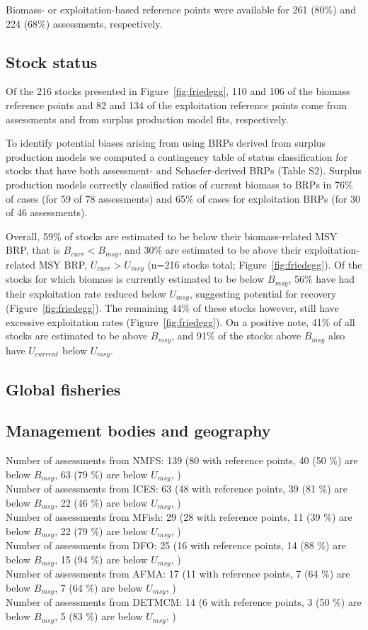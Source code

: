 Biomass- or exploitation-based reference points were available for
261 (80\%) and
224 (68\%)
assessments, respectively.

\subsection*{Stock status}
\noindent
Of the
216 stocks presented in
Figure~\ref{fig:friedegg}, 110 and
106 of the biomass reference points and
82 and
134 of the exploitation reference
points come from assessments and from surplus production model fits,
respectively.

To identify potential biases arising from using BRPs
derived from surplus production models we computed a contingency table
of status classification for stocks that have both assessment- and
Schaefer-derived BRPs (Table S2). Surplus production models correctly
classified ratios of current biomass to BRPs in
76\% of cases (for 59
of 78 assessments) and 65\%
of cases for exploitation BRPs (for 30 of
46 assessments).

Overall, 59\% of stocks are estimated
to be below their biomass-related MSY BRP, that is $B_{curr}<B_{msy}$,
and 30\% are estimated to be above
their exploitation-related MSY BRP, $U_{curr}>U_{msy}$
(n=216 stocks total; Figure~\ref{fig:friedegg}).
Of the stocks for which biomass is currently estimated to be below
$B_{msy}$, 56\% have had their
exploitation rate reduced below $U_{msy}$, suggesting potential for
recovery (Figure~\ref{fig:friedegg}). The remaining
44\% of these stocks however,
still have excessive exploitation rates
(Figure~\ref{fig:friedegg}). On a positive note,
41\% of all stocks are estimated to
be above $B_{msy}$, and 91\%
of the stocks above $B_{msy}$ also have $U_{current}$ below $U_{msy}$.


\subsection*{Global fisheries}

\subsection*{Management bodies and geography}
\noindent
Number of assessments from NMFS: 139 (80 with reference points, 40 (50 \%) are below $B_{msy}$, 63 (79 \%) are below $U_{msy}$, ) \\
Number of assessments from ICES: 63 (48 with reference points, 39 (81 \%) are below $B_{msy}$, 22 (46 \%) are below $U_{msy}$, ) \\
Number of assessments from MFish: 29 (28 with reference points, 11 (39 \%) are below $B_{msy}$, 22 (79 \%) are below $U_{msy}$, ) \\
Number of assessments from DFO: 25 (16 with reference points, 14 (88 \%) are below $B_{msy}$, 15 (94 \%) are below $U_{msy}$, ) \\
Number of assessments from AFMA: 17 (11 with reference points, 7 (64 \%) are below $B_{msy}$, 7 (64 \%) are below $U_{msy}$, ) \\
Number of assessments from DETMCM: 14 (6 with reference points, 3 (50 \%) are below $B_{msy}$, 5 (83 \%) are below $U_{msy}$, ) \\


